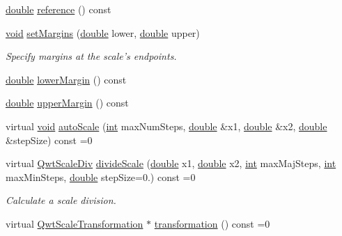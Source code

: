 \begin{DoxyCompactItemize}
\hyperlink{_super_l_u_support_8h_a8956b2b9f49bf918deed98379d159ca7}{double} \hyperlink{class_qwt_scale_engine_a5962458870865df797e84e3bd6badf02}{reference} () const 
\item 
\hyperlink{group___u_a_v_objects_plugin_ga444cf2ff3f0ecbe028adce838d373f5c}{void} \hyperlink{class_qwt_scale_engine_aed2ab1fc105a25fa97bbecf4b2f541a7}{set\-Margins} (\hyperlink{_super_l_u_support_8h_a8956b2b9f49bf918deed98379d159ca7}{double} lower, \hyperlink{_super_l_u_support_8h_a8956b2b9f49bf918deed98379d159ca7}{double} upper)
\begin{DoxyCompactList}\small\item\em Specify margins at the scale's endpoints. \end{DoxyCompactList}\item 
\hyperlink{_super_l_u_support_8h_a8956b2b9f49bf918deed98379d159ca7}{double} \hyperlink{class_qwt_scale_engine_a0cbcd5c35a8796baf8307bba19991bab}{lower\-Margin} () const 
\item 
\hyperlink{_super_l_u_support_8h_a8956b2b9f49bf918deed98379d159ca7}{double} \hyperlink{class_qwt_scale_engine_aa3fca2f37156fa3bd8ef21be8d339938}{upper\-Margin} () const 
\item 
virtual \hyperlink{group___u_a_v_objects_plugin_ga444cf2ff3f0ecbe028adce838d373f5c}{void} \hyperlink{class_qwt_scale_engine_aa27323d6d9d5348bd253a61b45e4785b}{auto\-Scale} (\hyperlink{ioapi_8h_a787fa3cf048117ba7123753c1e74fcd6}{int} max\-Num\-Steps, \hyperlink{_super_l_u_support_8h_a8956b2b9f49bf918deed98379d159ca7}{double} \&x1, \hyperlink{_super_l_u_support_8h_a8956b2b9f49bf918deed98379d159ca7}{double} \&x2, \hyperlink{_super_l_u_support_8h_a8956b2b9f49bf918deed98379d159ca7}{double} \&step\-Size) const =0
\item 
virtual \hyperlink{class_qwt_scale_div}{Qwt\-Scale\-Div} \hyperlink{class_qwt_scale_engine_a833fbdad4cce6e3b6448ee2549dc09e1}{divide\-Scale} (\hyperlink{_super_l_u_support_8h_a8956b2b9f49bf918deed98379d159ca7}{double} x1, \hyperlink{_super_l_u_support_8h_a8956b2b9f49bf918deed98379d159ca7}{double} x2, \hyperlink{ioapi_8h_a787fa3cf048117ba7123753c1e74fcd6}{int} max\-Maj\-Steps, \hyperlink{ioapi_8h_a787fa3cf048117ba7123753c1e74fcd6}{int} max\-Min\-Steps, \hyperlink{_super_l_u_support_8h_a8956b2b9f49bf918deed98379d159ca7}{double} step\-Size=0.) const =0
\begin{DoxyCompactList}\small\item\em Calculate a scale division. \end{DoxyCompactList}\item 
virtual \hyperlink{class_qwt_scale_transformation}{Qwt\-Scale\-Transformation} $\ast$ \hyperlink{class_qwt_scale_engine_a04a93d0dc39a3483957764e7749989fd}{transformation} () const =0
\end{DoxyCompactItemize}
